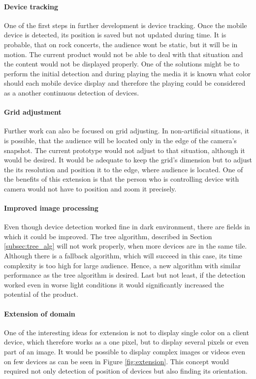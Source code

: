 \paragraph{Device tracking}
One of the first steps in further development is device tracking.
Once the mobile device is detected, its position is saved but not updated during time.
It is probable, that on rock concerts, the audience wont be static, but it will be in motion.
The current product would not be able to deal with that situation and the content would not be displayed properly.
One of the solutions might be to perform the initial detection and during playing the media it is known what color should each mobile device display and therefore the playing could be considered as a another continuous detection of devices.

\paragraph{Grid adjustment}
Further work can also be focused on grid adjusting.
In non-artificial situations, it is possible, that the audience will be located only in the edge of the camera's snapshot.
The current prototype would not adjust to that situation, although it would be desired.
It would be adequate to keep the grid's dimension but to adjust the its resolution and position it to the edge, where audience is located.
One of the benefits of this extension is that the person who is controlling device with camera would not have to position and zoom it precisely.

\paragraph{Improved image processing}
Even though device detection worked fine in dark environment, there are fields in which it could be improved.
The tree algorithm, described in Section \ref{subsec:tree_alg} will not work properly, when more devices are in the same tile.
Although there is a fallback algorithm, which will succeed in this case, its time complexity is too high for large audience.
Hence, a new algorithm with similar performance as the tree algorithm is desired.
Last but not least, if the detection worked even in worse light conditions it would significantly increased the potential of the product.

\paragraph{Extension of domain}
One of the interesting ideas for extension is not to display single color on a client device, which therefore works as a one pixel, but to display several pixels or even part of an image.
It would be possible to display complex images or videos even on few devices as can be seen in Figure \ref{fig:extension}.
This concept would required not only detection of position of devices but also finding its orientation.

